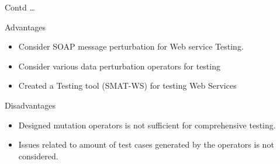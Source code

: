 \documentclass[10pt]{beamer}
\begin{document}
\begin{frame}{Contd \dots}

\begin{block}{Advantages}
    \begin{itemize}
    \item Consider SOAP message perturbation for Web service Testing.
    \item Consider various data perturbation operators for testing
    \item Created a Testing tool (SMAT-WS) for testing Web Services

    \end{itemize} 
    
\end{block}
\begin{block}{Disadvantages}
\begin{itemize}
\item Designed mutation operators is not sufficient for comprehensive testing.
\item Issues related to amount of test cases generated by the operators is not considered.

\end{itemize}
\end{block}

\end{frame}
\end{document}
